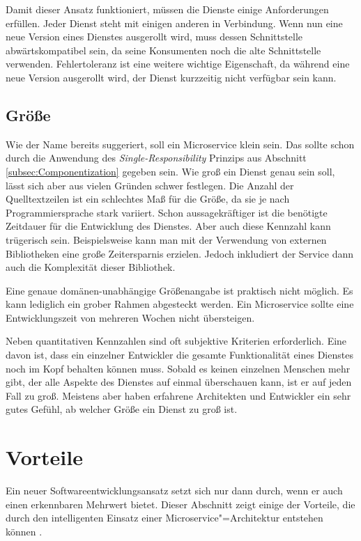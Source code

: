 Damit dieser Ansatz funktioniert, müssen die Dienste einige Anforderungen erfüllen. Jeder Dienst steht mit einigen anderen in Verbindung. Wenn nun eine neue Version eines Dienstes ausgerollt wird, muss dessen Schnittstelle abwärtskompatibel sein, da seine Konsumenten noch die alte Schnittstelle verwenden. Fehlertoleranz ist eine weitere wichtige Eigenschaft, da während eine neue Version ausgerollt wird, der Dienst kurzzeitig nicht verfügbar sein kann.

\subsection{Größe}

Wie der Name bereits suggeriert, soll ein Microservice klein sein. Das sollte schon durch die Anwendung des \textit{Single-Responsibility} Prinzips aus Abschnitt \ref{subsec:Componentization} gegeben sein. Wie groß ein Dienst genau sein soll, lässt sich aber aus vielen Gründen schwer festlegen. Die Anzahl der Quelltextzeilen ist ein schlechtes Maß für die Größe, da sie je nach Programmiersprache stark variiert. Schon aussagekräftiger ist die benötigte Zeitdauer für die Entwicklung des Dienstes. Aber auch diese Kennzahl kann trügerisch sein. Beispielsweise kann man mit der Verwendung von externen Bibliotheken eine große Zeitersparnis erzielen. Jedoch inkludiert der Service dann auch die Komplexität dieser Bibliothek.

Eine genaue domänen-unabhängige Größenangabe ist praktisch nicht möglich. Es kann lediglich ein grober Rahmen abgesteckt werden. Ein Microservice sollte eine Entwicklungszeit von mehreren Wochen nicht übersteigen.

Neben quantitativen Kennzahlen sind oft subjektive Kriterien erforderlich. Eine davon ist, dass ein einzelner Entwickler die gesamte Funktionalität eines Dienstes noch im Kopf behalten können muss. Sobald es keinen einzelnen Menschen mehr gibt, der alle Aspekte des Dienstes auf einmal überschauen kann, ist er auf jeden Fall zu groß. Meistens aber haben erfahrene Architekten und Entwickler ein sehr gutes Gefühl, ab welcher Größe ein Dienst zu groß ist.

\section{Vorteile}

Ein neuer Softwareentwicklungsansatz setzt sich nur dann durch, wenn er auch einen erkennbaren Mehrwert bietet. Dieser Abschnitt zeigt einige der Vorteile, die durch den intelligenten Einsatz einer Microservice"=Architektur entstehen können \cite{fowlerMSTradeOffs,newman2015building}.

